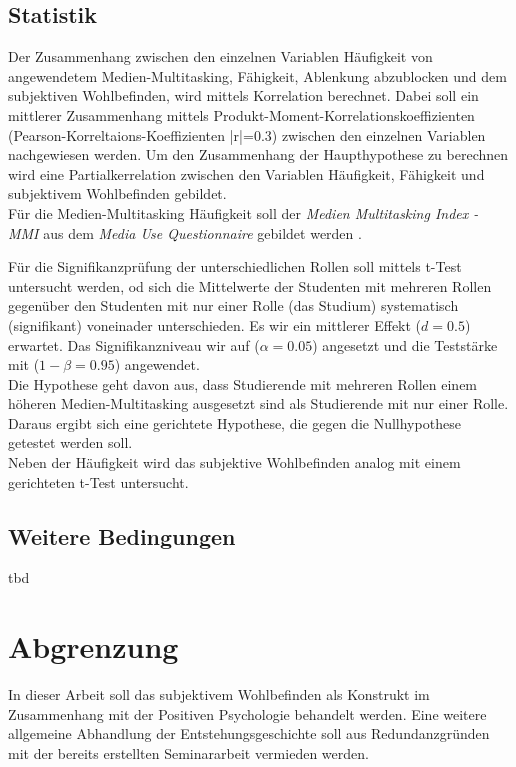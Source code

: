 \subsection*{Statistik}
Der Zusammenhang zwischen den einzelnen Variablen Häufigkeit von angewendetem Medien-Multitasking, Fähigkeit, Ablenkung abzublocken und dem subjektiven Wohlbefinden, wird mittels Korrelation berechnet. Dabei soll ein mittlerer Zusammenhang mittels Produkt-Moment-Korrelationskoeffizienten (Pearson-Korreltaions-Koeffizienten |r|=0.3) zwischen den einzelnen Variablen nachgewiesen werden. Um den Zusammenhang der Haupthypothese zu berechnen wird eine Partialkerrelation zwischen den Variablen Häufigkeit, Fähigkeit und subjektivem Wohlbefinden gebildet.\\
Für die Medien-Multitasking Häufigkeit soll der \textit{Medien Multitasking Index - MMI} aus dem \textit{Media Use Questionnaire} gebildet werden \cite{Ophir2009}.\par
Für die Signifikanzprüfung der unterschiedlichen Rollen soll mittels t-Test untersucht werden, od sich die Mittelwerte der Studenten mit mehreren Rollen gegenüber den Studenten mit nur einer Rolle (das Studium) systematisch (signifikant) voneinader unterschieden. Es wir ein mittlerer Effekt ($d=0.5$) erwartet. Das Signifikanzniveau wir auf ($\alpha=0.05$) angesetzt und die Teststärke mit ($1-\beta=0.95$) angewendet.\\
Die Hypothese geht davon aus, dass Studierende mit mehreren Rollen einem höheren Medien-Multitasking ausgesetzt sind als Studierende mit nur einer Rolle. Daraus ergibt sich eine gerichtete Hypothese, die gegen die Nullhypothese getestet werden soll.\\
Neben der Häufigkeit wird das subjektive Wohlbefinden analog mit einem gerichteten t-Test untersucht.
\subsection*{Weitere Bedingungen}
tbd
\section*{Abgrenzung}\label{section.abgrenzung}
In dieser Arbeit soll das subjektivem Wohlbefinden als Konstrukt im Zusammenhang mit der Positiven Psychologie behandelt werden. Eine weitere allgemeine Abhandlung der Entstehungsgeschichte soll aus Redundanzgründen mit der bereits erstellten Seminararbeit \cite{Ernst2013} vermieden werden.
